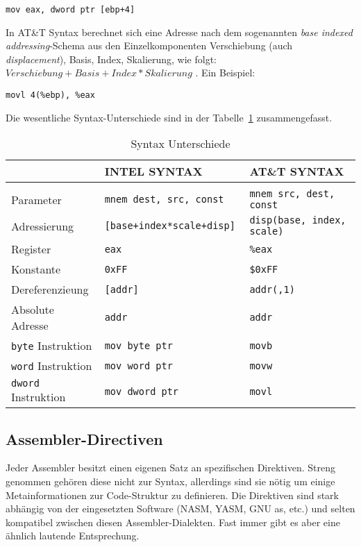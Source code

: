 \hspace{5mm} 
\texttt{mov eax, dword ptr [ebp+4]}

In AT\&T Syntax berechnet sich eine Adresse nach dem sogenannten \emph{base
indexed addressing}-Schema aus den Einzelkomponenten Verschiebung (auch
\emph{displacement}), Basis, Index, Skalierung, wie folgt: $Verschiebung + Basis +
Index*Skalierung$ . Ein Beispiel:

\hspace{5mm} 
\texttt{movl 4(\%ebp), \%eax}

Die wesentliche Syntax-Unterschiede sind in der Tabelle~\ref{tab:syntaxdiffs}
zusammengefasst.


\begin{table}[h]	%
\begin{tabular}{lll}
\\	                          & INTEL SYNTAX                  & AT\&T SYNTAX
\\\hline
\\	Parameter 								& \tt mnem dest, src, const  	  & \tt mnem src, dest, const
\\  Adressierung  				  	&	\tt [base+index*scale+disp]   & \tt disp(base, index, scale)
\\	Register      						& \tt eax              					& \tt \%eax
\\	Konstante     						& \tt 0xFF             					& \tt \$0xFF
\\	Dereferenzieung   				& \tt [addr]           					& \tt addr(,1)
\\	Absolute Adresse 			 	  & \tt addr             					& \tt *addr
\\	{\tt byte} Instruktion    & \tt mov byte ptr     					& \tt movb
\\	{\tt word} Instruktion    & \tt mov word ptr     					& \tt movw
\\  {\tt dword} Instruktion   & \tt mov dword ptr    					& \tt movl
\end{tabular}
\caption{Syntax Unterschiede} \label{tab:syntaxdiffs}
\end{table}

\subsection{Assembler-Directiven}
Jeder Assembler besitzt einen eigenen Satz an spezifischen Direktiven. Streng
genommen gehören diese nicht zur Syntax, allerdings sind sie nötig um einige
Metainformationen zur Code-Struktur zu definieren. Die Direktiven sind stark
abhängig von der eingesetzten Software (NASM, YASM, GNU as, etc.) und selten
kompatibel zwischen diesen Assembler-Dialekten. Fast immer gibt es aber eine
ähnlich lautende Entsprechung. 

